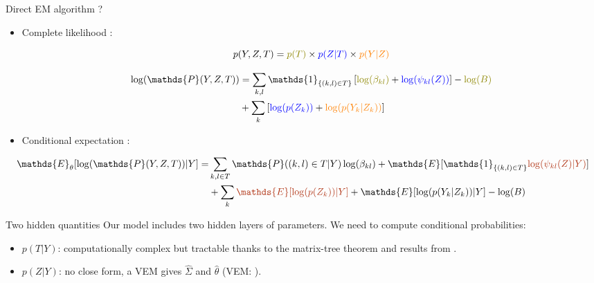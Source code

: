\documentclass[11pt]{beamer}
\newcommand{\emphase}[1]{\textcolor{Complement}{#1}}
\newcommand{\bleu}[1]{\textcolor{Framableulight}{#1}}
\begin{document}
\begin{frame}{Direct EM algorithm ?}
\footnotesize 
\begin{itemize}
    \item \bleu{Complete likelihood :}

 \[ p(Y,Z,T) = \color{olive}p(T)\color{black}\times\color{blue}p(Z|T)\color{black}\times\color{orange}p(Y|Z)\]
 
\begin{align*}
 \log(\mathds{P}(Y,Z,T)) &= \sum_{k,l} \mathds{1}_{\{(k,l) \in T\}} \left[\color{olive}\log(\beta_{kl})\color{black} + \color{blue}\log(\psi_{kl}(Z)) \color{black}\right]-\color{olive}\log(B)\color{black} \\
 &+\sum_k \left[\color{blue} \log(p(Z_k))\color{black} + \color{orange}\log(p(Y_k|Z_k))\color{black}\right]
 \end{align*}

 \item \bleu{Conditional expectation :}
\end{itemize}
\begin{align*}
    \mathds{E}_\theta[\log(\mathds{P}(Y,Z,T))|Y] =&\sum_{k,l\in T} \mathds{P}((k,l) \in T|Y) \log(\beta_{kl}) + \mathds{E}[\mathds{1}_{\{(k,l) \in T\}}\emphase{\log(\psi_{kl}(Z)|Y)}]\\
& +\sum_k \emphase{\mathds{E}[\log(p(Z_k)) | Y]} + \mathds{E}[\log(p(Y_k|Z_k)) | Y]-\log(B)
\end{align*} 

\normalsize 
\end{frame}
\begin{frame}{Two hidden quantities}
Our model includes two hidden layers of parameters. We need to compute conditional probabilities:
 \bigskip
 
\begin{itemize}
    \item \emphase{$p(T|Y)$}: computationally complex but tractable thanks to the matrix-tree theorem and results from \bleu{ \cite{MeilaJaak}}.
    \bigskip
    \item \emphase{$p(Z|Y)$}: no close form, a VEM gives $\hat{\Sigma}$ and 
    $\hat{\theta}$ (VEM: \bleu{\citet{CMR17}}).
\end{itemize}
\end{frame}

\end{document}
